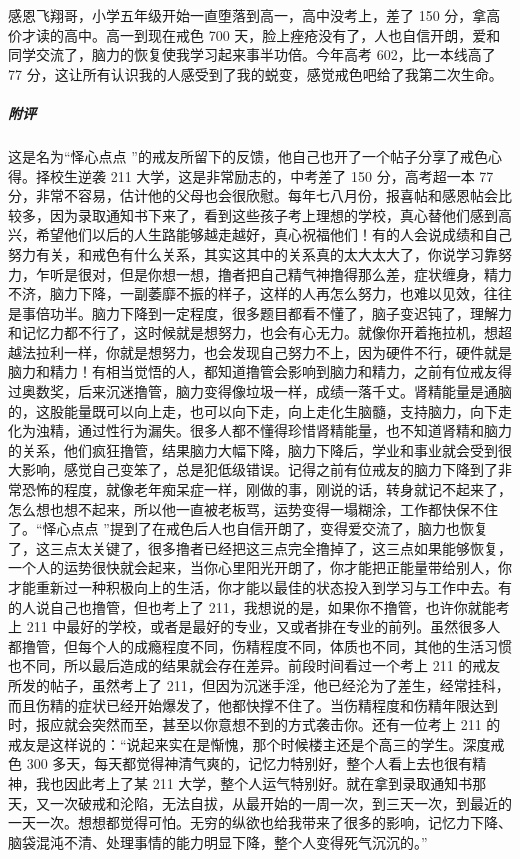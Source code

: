 \begin{case}
    感恩飞翔哥，小学五年级开始一直堕落到高一，高中没考上，差了 150 分，拿高价才读的高中。高一到现在戒色 700 天，脸上痤疮没有了，人也自信开朗，爱和同学交流了，脑力的恢复使我学习起来事半功倍。今年高考 602，比一本线高了 77 分，这让所有认识我的人感受到了我的蜕变，感觉戒色吧给了我第二次生命。
    \subparagraph{附评} 这是名为“怿心点点 ”的戒友所留下的反馈，他自己也开了一个帖子分享了戒色心得。择校生逆袭 211 大学，这是非常励志的，中考差了 150 分，高考超一本 77 分，非常不容易，估计他的父母也会很欣慰。每年七八月份，报喜帖和感恩帖会比较多，因为录取通知书下来了，看到这些孩子考上理想的学校，真心替他们感到高兴，希望他们以后的人生路能够越走越好，真心祝福他们！有的人会说成绩和自己努力有关，和戒色有什么关系，其实这其中的关系真的太大太大了，你说学习靠努力，乍听是很对，但是你想一想，撸者把自己精气神撸得那么差，症状缠身，精力不济，脑力下降，一副萎靡不振的样子，这样的人再怎么努力，也难以见效，往往是事倍功半。脑力下降到一定程度，很多题目都看不懂了，脑子变迟钝了，理解力和记忆力都不行了，这时候就是想努力，也会有心无力。就像你开着拖拉机，想超越法拉利一样，你就是想努力，也会发现自己努力不上，因为硬件不行，硬件就是脑力和精力！有相当觉悟的人，都知道撸管会影响到脑力和精力，之前有位戒友得过奥数奖，后来沉迷撸管，脑力变得像垃圾一样，成绩一落千丈。肾精能量是通脑的，这股能量既可以向上走，也可以向下走，向上走化生脑髓，支持脑力，向下走化为浊精，通过性行为漏失。很多人都不懂得珍惜肾精能量，也不知道肾精和脑力的关系，他们疯狂撸管，结果脑力大幅下降，脑力下降后，学业和事业就会受到很大影响，感觉自己变笨了，总是犯低级错误。记得之前有位戒友的脑力下降到了非常恐怖的程度，就像老年痴呆症一样，刚做的事，刚说的话，转身就记不起来了，怎么想也想不起来，所以他一直被老板骂，运势变得一塌糊涂，工作都快保不住了。“怿心点点 ”提到了在戒色后人也自信开朗了，变得爱交流了，脑力也恢复了，这三点太关键了，很多撸者已经把这三点完全撸掉了，这三点如果能够恢复，一个人的运势很快就会起来，当你心里阳光开朗了，你才能把正能量带给别人，你才能重新过一种积极向上的生活，你才能以最佳的状态投入到学习与工作中去。有的人说自己也撸管，但也考上了 211，我想说的是，如果你不撸管，也许你就能考上 211 中最好的学校，或者是最好的专业，又或者排在专业的前列。虽然很多人都撸管，但每个人的成瘾程度不同，伤精程度不同，体质也不同，其他的生活习惯也不同，所以最后造成的结果就会存在差异。前段时间看过一个考上 211 的戒友所发的帖子，虽然考上了 211，但因为沉迷手淫，他已经沦为了差生，经常挂科，而且伤精的症状已经开始爆发了，他都快撑不住了。当伤精程度和伤精年限达到时，报应就会突然而至，甚至以你意想不到的方式袭击你。还有一位考上 211 的戒友是这样说的：“说起来实在是惭愧，那个时候楼主还是个高三的学生。深度戒色 300 多天，每天都觉得神清气爽的，记忆力特别好，整个人看上去也很有精神，我也因此考上了某 211 大学，整个人运气特别好。就在拿到录取通知书那天，又一次破戒和沦陷，无法自拔，从最开始的一周一次，到三天一次，到最近的一天一次。想想都觉得可怕。无穷的纵欲也给我带来了很多的影响，记忆力下降、脑袋混沌不清、处理事情的能力明显下降，整个人变得死气沉沉的。”
\end{case}

